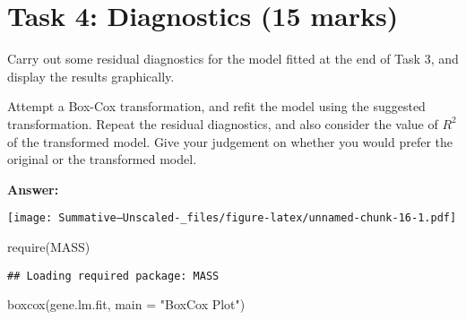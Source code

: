 \documentclass[
]{article}
\newenvironment{Shaded}{\begin{snugshade}}{\end{snugshade}}
\newcommand{\AttributeTok}[1]{\textcolor[rgb]{0.77,0.63,0.00}{#1}}
\newcommand{\CommentTok}[1]{\textcolor[rgb]{0.56,0.35,0.01}{\textit{#1}}}
\newcommand{\DecValTok}[1]{\textcolor[rgb]{0.00,0.00,0.81}{#1}}
\newcommand{\FloatTok}[1]{\textcolor[rgb]{0.00,0.00,0.81}{#1}}
\newcommand{\FunctionTok}[1]{\textcolor[rgb]{0.00,0.00,0.00}{#1}}
\newcommand{\NormalTok}[1]{#1}
\newcommand{\SpecialCharTok}[1]{\textcolor[rgb]{0.00,0.00,0.00}{#1}}
\newcommand{\StringTok}[1]{\textcolor[rgb]{0.31,0.60,0.02}{#1}}
\begin{document}
\hypertarget{task-4-diagnostics-15-marks}{%
\section{Task 4: Diagnostics (15
marks)}\label{task-4-diagnostics-15-marks}}

Carry out some residual diagnostics for the model fitted at the end of
Task 3, and display the results graphically.

Attempt a Box-Cox transformation, and refit the model using the
suggested transformation. Repeat the residual diagnostics, and also
consider the value of \(R^2\) of the transformed model. Give your
judgement on whether you would prefer the original or the transformed
model.

\textbf{Answer:}

\begin{Shaded}
\end{Shaded}

\texttt{[image: Summative--Unscaled-\_files/figure-latex/unnamed-chunk-16-1.pdf]}

\begin{Shaded}
\begin{Highlighting}[]
\FunctionTok{require}\NormalTok{(MASS)}
\end{Highlighting}
\end{Shaded}

\begin{verbatim}
## Loading required package: MASS
\end{verbatim}

\begin{Shaded}
\begin{Highlighting}[]
\FunctionTok{boxcox}\NormalTok{(gene.lm.fit, }\AttributeTok{main =} \StringTok{"BoxCox Plot"}\NormalTok{)}
\end{Highlighting}
\end{Shaded}
\end{document}
